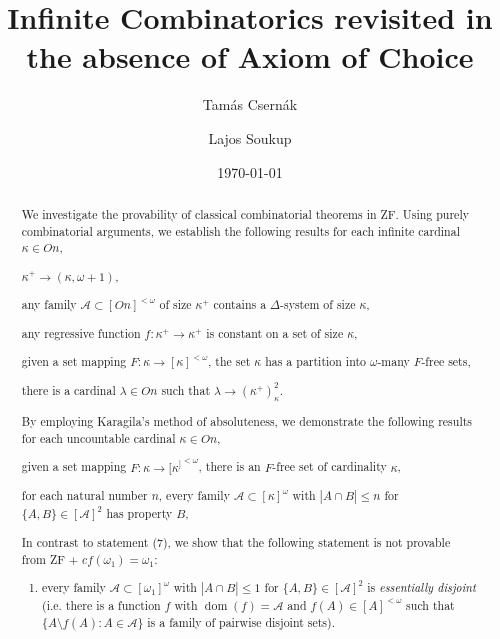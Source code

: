 \documentclass[a4paper,10pt,reqno]{amsart}
\author[T. Csern\'ak]{
Tam\'as Csern\'ak }
\author[L. Soukup]{
Lajos Soukup }
\title[Infinite Combinatorics revisited]{Infinite Combinatorics revisited in the absence of Axiom of Choice}
\date{\today}
\numberwithin{equation}{section}
\theoremstyle{definition}
\theoremstyle{remark}
\newcommand{\mc}[1]{\mathcal{#1}}
\newcommand{\setm}{\setminus}
\newcommand{\subs}{\subset}
\newcommand{\dom}{\operatorname{dom}}
\begin{document}
       
       

\newcommand{\dsystem}[3]{{[#1]}^{<#2}\to \Delta(#3)}
\newcommand{\freesetsmall}[3]{Free(#1,#2,#3)}
\newcommand{\freeset}[3]{Free(#1\mapsto {[#1]}^{<#2}, #3)}
\newcommand{\freeUnionsmall}[3]{FreeUnion(#1,#2,#3)}
\newcommand{\freeUnion}[3]{FreeUnion(#1\mapsto {[#1]}^{<#2}, #3)}

\newcommand{\KK}[2]{#1[#2]}
\newcommand{\KKG}[1]{\KK{#1}{\mc G}}
\newcommand{\KKGU}[1]{\KKG{\underline{#1}}}


\begin{abstract}
    We investigate the provability of classical combinatorial theorems in ZF.
    Using purely combinatorial arguments, we establish the following results for each
infinite cardinal ${\kappa}\in On$, 
    \begin{inparaenum}[(1)]
\item ${\kappa}^+\to ({\kappa},{\omega}+1)$, 
\item any family $\mc A\subs [{On}]^{<{\omega}}$ of size ${\kappa}^+$
contains a $\Delta$-system of size ${\kappa}$,
\item any regressive function $f:{\kappa}^+\to {\kappa}^+$ is constant on a set
of size ${\kappa}$,
\item given a set mapping $F:{\kappa}\to {[{\kappa}]}^{<{\omega}}$, 
the set  ${\kappa}$ has a  partition into ${\omega}$-many $F$-free sets,  
\item there is a cardinal ${\lambda}\in On$
such that ${\lambda}\to ({\kappa}^+)^2_{\kappa}$.
\end{inparaenum}

By employing Karagila's method of absoluteness, we demonstrate the following results for each uncountable cardinal 
${\kappa}\in On$,
\begin{inparaenum}[(1)]
        \addtocounter{enumi}{5}
\item given a set mapping $F:{\kappa}\to {[{\kappa}^]}^{<{\omega}}$,  there is 
an $F$-free set of cardinality ${\kappa}$, 
\item for each natural number $n$, every family $\mc A\subs {[{\kappa}]}^{{\omega}}$
with $|A\cap B|\le n$ for $\{A,B\}\in {[\mc A]}^{2}$ has property $B$,  
\end{inparaenum}


In contrast to statement (7), we show that the following statement is not provable from ZF +
 $cf({\omega}_1)={\omega}_1$:
\begin{enumerate}[($8^*$)]
\item every family $\mc A\subs {[{\omega}_1]}^{{\omega}}$
with $|A\cap B|\le 1$ for $\{A,B\}\in {[\mc A]}^{2}$ is {\em essentially disjoint}
(i.e. there is a 
        function $f$ with $\dom(f)=\mc A$ and $f(A)\in [A]^{<{\omega}}$
        such that $\{A\setm f(A):A\in \mc A\}$ is a family of pairwise disjoint sets). 
\end{enumerate}



\end{abstract}
\end{document}
